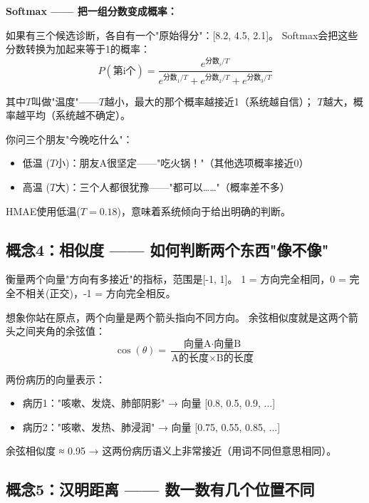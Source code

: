 \documentclass[11pt,a4paper]{ctexart}
\begin{document}
\textbf{Softmax —— 把一组分数变成概率：}

如果有三个候选诊断，各自有一个"原始得分"：[8.2, 4.5, 2.1]。
Softmax会把这些分数转换为加起来等于1的概率：
$$P(\text{第i个}) = \frac{e^{\text{分数}_i / T}}{e^{\text{分数}_1/T} + e^{\text{分数}_2/T} + e^{\text{分数}_3/T}}$$

其中$T$叫做"温度"——$T$越小，最大的那个概率越接近1（系统越自信）；
$T$越大，概率越平均（系统越不确定）。

\begin{exambox}
你问三个朋友"今晚吃什么"：
\begin{itemize}[nosep]
\item 低温 ($T$小)：朋友A很坚定——"吃火锅！"（其他选项概率接近0）
\item 高温 ($T$大)：三个人都很犹豫——"都可以……"（概率差不多）
\end{itemize}
HMAE使用低温($T=0.18$)，意味着系统倾向于给出明确的判断。
\end{exambox}

\subsection{概念4：相似度 —— 如何判断两个东西"像不像"}

\begin{defbox}
衡量两个向量"方向有多接近"的指标，范围是[-1, 1]。
1 = 方向完全相同，0 = 完全不相关(正交)，-1 = 方向完全相反。
\end{defbox}

想象你站在原点，两个向量是两个箭头指向不同方向。
余弦相似度就是这两个箭头之间夹角的余弦值：
$$\cos(\theta) = \frac{\text{向量A} \cdot \text{向量B}}{\text{A的长度} \times \text{B的长度}}$$

\begin{exambox}[例子：病历相似度]
两份病历的向量表示：
\begin{itemize}[nosep]
\item 病历1："咳嗽、发烧、肺部阴影" → 向量 [0.8, 0.5, 0.9, ...]
\item 病历2："咳嗽、发热、肺浸润" → 向量 [0.75, 0.55, 0.85, ...]
\end{itemize}
余弦相似度 ≈ 0.95 → 这两份病历语义上非常接近（用词不同但意思相同）。
\end{exambox}

\subsection{概念5：汉明距离 —— 数一数有几个位置不同}
\end{document}
